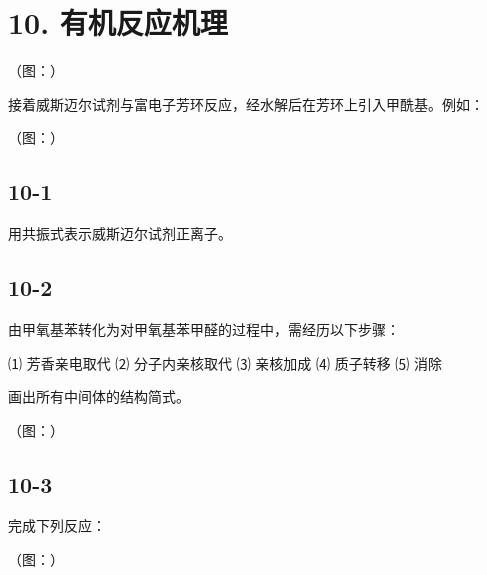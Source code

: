 \section*{10. 有机反应机理}
（图：）

接着威斯迈尔试剂与富电⼦芳环反应，经⽔解后在芳环上引⼊甲酰基。例如：

（图：）

\subsection*{10-1}
⽤共振式表⽰威斯迈尔试剂正离⼦。

\subsection*{10-2}
由甲氧基苯转化为对甲氧基苯甲醛的过程中，需经历以下步骤：

⑴ 芳⾹亲电取代 ⑵ 分⼦内亲核取代 ⑶ 亲核加成 ⑷ 质⼦转移 ⑸ 消除

画出所有中间体的结构简式。

（图：）

\subsection*{10-3}
完成下列反应：

（图：）
